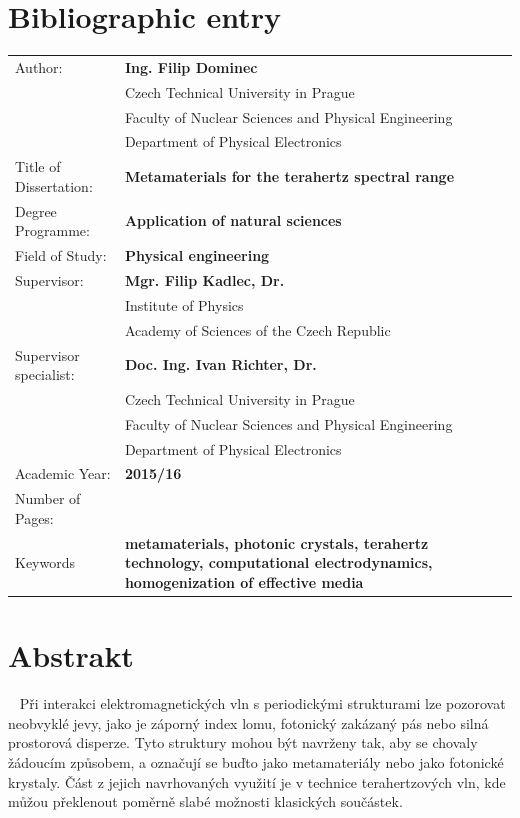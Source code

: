 \chapter*{Bibliographic entry}
\bgroup {}
\noindent\begin{tabular}{p{.25\linewidth}p{.7\linewidth}}
Author:					&\textbf{Ing. Filip Dominec} \\
					~	&Czech Technical University in Prague\\
					~	&Faculty of Nuclear Sciences and Physical Engineering\\ 
					~	&Department of Physical Electronics\\
Title of Dissertation:	&\textbf{Metamaterials for the terahertz spectral range} \\
Degree Programme:		&\textbf{Application of natural sciences} \\
Field of Study:			&\textbf{Physical engineering} \\
Supervisor:				&\textbf{Mgr. Filip Kadlec, Dr.} \\
					~	&Institute of Physics\\ 
					~	&Academy of Sciences of the Czech Republic\\  %
Supervisor specialist:	&\textbf{Doc. Ing. Ivan Richter, Dr.} \\
					~	&Czech Technical University in Prague\\ 
					~	&Faculty of Nuclear Sciences and Physical Engineering\\  
					~	&Department of Physical Electronics\\
Academic Year:			&\textbf{2015/16} \\
Number of Pages:		&\textbf{\pageref{enddocument}} \\
Keywords				&\textbf{metamaterials, photonic crystals, terahertz technology, computational electrodynamics, homogenization of effective media} \\
\end{tabular}
\egroup
\thispagestyle{empty} \newpage


\vspace{-20mm}
\chapter*{Abstrakt}
\noindent ~
Při interakci elektromagnetických vln s periodickými strukturami lze pozorovat neobvyklé jevy, jako je záporný index lomu, fotonický zakázaný pás nebo silná prostorová disperze. Tyto struktury mohou být navrženy tak, aby se chovaly žádoucím způsobem, a označují se buďto jako metamateriály nebo jako fotonické krystaly. Část z jejich navrhovaných využití je v technice terahertzových vln, kde můžou překlenout po\-měr\-ně slabé možnosti klasických součástek.  

